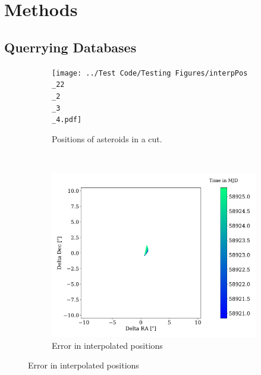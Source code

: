 \documentclass{UCreport}
\begin{document}
\section{Methods}\label{Sec:Meth}

\subsection{Querrying Databases}\label{SubSec:Querry}

\begin{figure}[h!]
  \begin{subfigure}[t]{0.5\textwidth}
    \centering
    \texttt{[image: ../Test Code/Testing Figures/interpPos\\\_22\\\_2\\\_3\\\_4.pdf]}
    \caption[Positions]{Positions of asteroids in a cut.}
    \label{Fig:interpPos}
  \end{subfigure}
  ~
  \begin{subfigure}[t]{0.5\textwidth}
    \centering
    \includegraphics[width =\textwidth]{../Test Code/Testing Figures/1989 BC1PosCheck.pdf} %
    \caption[Errors]{Error in interpolated positions}
    \label{Fig:errPos}
  \end{subfigure}


\end{figure}
\end{document}

